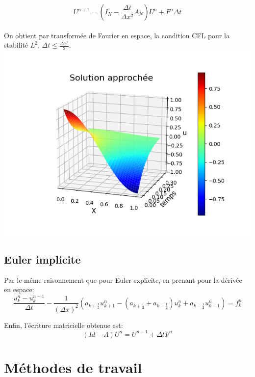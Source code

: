 \documentclass[a4paper,12pt,twoside]{report}
\begin{document}
$$U^{n+1} = (I_N - \frac{\Delta t}{ \Delta x^2} A_N)U^n  + F^n \Delta t $$ \\

On obtient par transformée de Fourier en espace, la condition CFL pour la stabilité $L^2$, $\Delta t \leq \frac{\Delta x^2}{2}$.\\

\includegraphics[scale=0.5]{./figure_1.png}\\


\subsection{Euler implicite}
Par le même raisonnement que pour Euler explicite, en prenant pour la dérivée en espace:\\

$$ \frac{u_{k} ^{n} - u_{k} ^{n-1}}{ \Delta t} - \frac{1}{( \Delta x)^2} (a_{k+\frac{1}{2}} u_{k+1}^n -(a_{k+\frac{1}{2}} +a_{k-\frac{1}{2}}) u_k ^n + a_{k-\frac{1}{2}}u_{k-1} ^n ) = f_k ^n $$


Enfin, l'écriture matricielle obtenue est:\\

$$ (Id - A)U^n = U^{n-1} + \Delta t F^n $$



\smallbreak

\section{Méthodes de travail}
\end{document}
